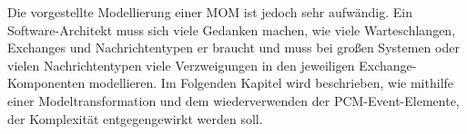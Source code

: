 Die vorgestellte Modellierung einer MOM ist jedoch sehr aufwändig. Ein Software-Architekt muss sich viele Gedanken machen, wie viele Warteschlangen, Exchanges und Nachrichtentypen er braucht und muss bei großen Systemen oder vielen Nachrichtentypen viele Verzweigungen in den jeweiligen Exchange-Komponenten modellieren. Im Folgenden Kapitel wird beschrieben, wie mithilfe einer Modeltransformation und dem wiederverwenden der PCM-Event-Elemente, der Komplexität entgegengewirkt werden soll.


